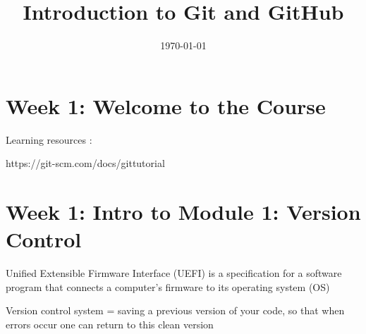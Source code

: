 \documentclass[11pt, onecolumn]{article}
\title{Introduction to Git and GitHub}	%
\date{\today}	%
\begin{document}

\maketitle		%

\thispagestyle{empty}	%




\newpage				%

\tableofcontents		%

\newpage				%



\section{Week 1: Welcome to the Course}

Learning resources :

https://git-scm.com/docs/gittutorial



\section{Week 1: Intro to Module 1: Version Control}

Unified Extensible Firmware Interface (UEFI) is a specification for a software program that connects a computer's firmware to its operating system (OS)

Version control system = saving a previous version of your code, so that when errors occur one can return to this clean version
\end{document}

